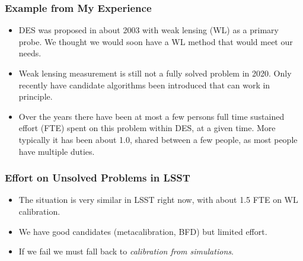 \documentclass{beamer}
\begin{document}
\frame
{
    \frametitle{Example from My Experience}


    \begin{itemize}

        \item DES was proposed in about 2003 with weak lensing (WL) as a primary
            probe.  We thought we would soon have a WL method that
            would meet our needs.

        \item Weak lensing measurement is still not a fully solved problem in
            2020.  Only recently have candidate algorithms been introduced that
            can work in principle.


        \item  Over the years there have been at most a few persons full time
            sustained effort (FTE) spent on this problem within DES, at a given
            time.  More typically it has been about 1.0, shared between a few
            people, as most people have multiple duties.


    \end{itemize}

}
\frame
{
    \frametitle{Effort on Unsolved Problems in LSST}


    \begin{itemize}

        \item The situation is very similar in LSST right now, with about 1.5
            FTE on WL calibration.

        \item We have good candidates (metacalibration, BFD) but limited effort.

        \item If we fail we must fall back to {\em calibration from simulations}.

    \end{itemize}

}
\end{document}
